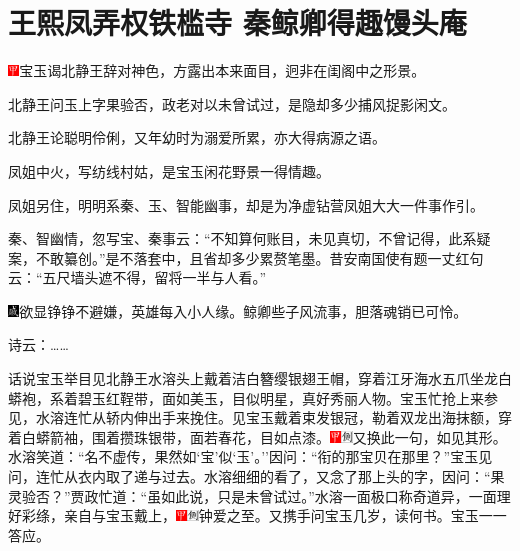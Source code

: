 

\chapter{王熙凤弄权铁槛寺 秦鲸卿得趣馒头庵}
{\includegraphics[width=3mm]{../Images/00002}\kaishu 宝玉谒北静王辞对神色，方露出本来面目，迥非在闺阁中之形景。}

{\kaishu 北静王问玉上字果验否，政老对以未曾试过，是隐却多少捕风捉影闲文。}

{\kaishu 北静王论聪明伶俐，又年幼时为溺爱所累，亦大得病源之语。}

{\kaishu 凤姐中火，写纺线村姑，是宝玉闲花野景一得情趣。}

{\kaishu 凤姐另住，明明系秦、玉、智能幽事，却是为净虚钻营凤姐大大一件事作引。}

{\kaishu 秦、智幽情，忽写宝、秦事云：``不知算何账目，未见真切，不曾记得，此系疑案，不敢纂创。''是不落套中，且省却多少累赘笔墨。昔安南国使有题一丈红句云：``五尺墙头遮不得，留将一半与人看。''}

{\includegraphics[width=3mm]{../Images/00005}\kaishu 欲显铮铮不避嫌，英雄每入小人缘。鲸卿些子风流事，胆落魂销已可怜。}

诗云：\ldots{}\ldots{}

话说宝玉举目见北静王水溶头上戴着洁白簪缨银翅王帽，穿着江牙海水五爪坐龙白蟒袍，系着碧玉红鞓带，面如美玉，目似明星，真好秀丽人物。宝玉忙抢上来参见，水溶连忙从轿内伸出手来挽住。见宝玉戴着束发银冠，勒着双龙出海抹额，穿着白蟒箭袖，围着攒珠银带，面若春花，目如点漆。{\includegraphics[width=3mm]{../Images/00002}\includegraphics[width=3mm]{../Images/00011}\footnotesize \kaishu 又换此一句，如见其形。}水溶笑道：``名不虚传，果然如`宝'似`玉'。''因问：``衔的那宝贝在那里？''宝玉见问，连忙从衣内取了递与过去。水溶细细的看了，又念了那上头的字，因问：``果灵验否？''贾政忙道：``虽如此说，只是未曾试过。''水溶一面极口称奇道异，一面理好彩绦，亲自与宝玉戴上，{\includegraphics[width=3mm]{../Images/00002}\includegraphics[width=3mm]{../Images/00011}\footnotesize \kaishu 钟爱之至。}又携手问宝玉几岁，读何书。宝玉一一答应。

